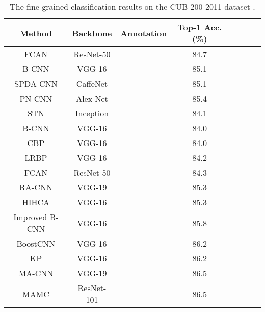 \documentclass[10pt,twocolumn,letterpaper]{article}
\begin{document}
\begin{table}[t]
    \centering
    \small { \setlength{\tabcolsep}{1.0pt}
    \caption{The fine-grained classification results on the CUB-200-2011 dataset \cite{report-wahcub_200_2011}.}
    \label{tab:birds}    
    \begin{tabular}{ccccpppp}
    	\toprule
    	                   Method                     &   Backbone   & Annotation & Top-1 Acc. (\%) \\ \midrule
    	   FCAN \cite{DBLP:journals/corr/LiuXWL16}    &  ResNet-50   & \checkmark &      84.7       \\
    	     B-CNN \cite{DBLP:conf/iccv/LinRM15}      &    VGG-16    & \checkmark &      85.1       \\
    	SPDA-CNN \cite{DBLP:conf/cvpr/ZhangXEHZEM16}  &   CaffeNet   & \checkmark &      85.1       \\
    	PN-CNN \cite{DBLP:journals/corr/BransonHBP14} &   Alex-Net   & \checkmark &      85.4       \\ \midrule
    	  STN \cite{DBLP:conf/nips/JaderbergSZK15}    &  Inception   &    &      84.1       \\
    	     B-CNN \cite{DBLP:conf/iccv/LinRM15}      &    VGG-16    &    &      84.0       \\
    	   CBP \cite{DBLP:journals/corr/GaoBZD15}     &    VGG-16    &    &      84.0       \\
    	   LRBP \cite{DBLP:journals/corr/KongF16}     &    VGG-16    &    &      84.2       \\
    	   FCAN \cite{DBLP:journals/corr/LiuXWL16}    &  ResNet-50   &    &      84.3       \\
    	     RA-CNN \cite{DBLP:conf/cvpr/FuZM17}      &    VGG-19    &    &      85.3       \\
    	     HIHCA \cite{DBLP:conf/iccv/CaiZZ17}      &    VGG-16    &    &      85.3       \\
    	 Improved B-CNN \cite{DBLP:conf/bmvc/LinM17}  &    VGG-16    &    &      85.8       \\
    	BoostCNN \cite{DBLP:conf/bmvc/MoghimiBSYVL16} &    VGG-16    &    &      86.2       \\
    	     KP \cite{DBLP:conf/cvpr/CuiZWLLB17}      &    VGG-16    &    &      86.2       \\
    	   MA-CNN \cite{DBLP:conf/iccv/ZhengFML17}    &    VGG-19    &    &      86.5       \\
    	     MAMC \cite{DBLP:conf/eccv/SunYZD18}      &  ResNet-101  &    &      86.5       \\

\end{tabular}}
\end{table}
\end{document}
